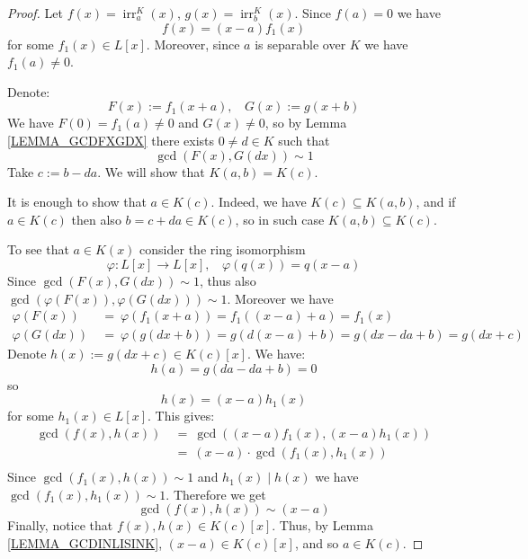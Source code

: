 \documentclass[12pt, letterpaper, oneside]{article}
\theoremstyle{plain}
\theoremstyle{definition}
\newcommand{\irr}{\operatorname{irr}}
\newcommand{\vs}{\vskip 5mm}
\begin{document}
\vs \vs

\begin{proof}
Let $f(x) = \irr^{K}_{a}(x)$, $g(x)= \irr^{K}_{b}(x)$. Since $f(a)= 0$ we have 
$$f(x)= (x-a)f_{1}(x)$$
for some $f_{1}(x)\in L[x]$. Moreover, since $a$ is separable over $K$ we have 
$f_{1}(a) \neq 0$. 

Denote:
$$F(x):= f_{1}(x+a), \ \ \ \ G(x):= g(x+b)$$
We have $F(0) = f_{1}(a) \neq 0$ and $G(x)\neq 0$, so by Lemma \ref{LEMMA_GCDFXGDX}
there exists $0\neq d\in K$ such that 
$$\gcd(F(x), G(dx))\sim 1$$
Take $c:= b-da$. We will show that $K(a, b) = K(c)$. 

It is enough to show that $a\in K(c)$. Indeed, we have $K(c)\subseteq K(a, b)$, and if
$a\in K(c)$ then also $b= c + da \in K(c)$, so in such case $K(a, b)\subseteq K(c)$. 


To see that $a\in K(x)$ consider the ring isomorphism 
$$\varphi\colon L[x] \to L[x], \ \ \ \ \varphi(q(x)) = q(x-a)$$
Since $\gcd(F(x), G(dx))\sim 1$, thus also $\gcd(\varphi(F(x)), \varphi(G(dx)))\sim 1$.
Moreover we have 
\begin{align*}
\varphi(F(x)) & \ = \   \varphi(f_{1}(x+a)) = f_{1}((x-a)+a) = f_{1}(x)  \ \\
\varphi(G(dx)) & \ =\   \varphi(g(dx +b)) = g(d(x-a) +b) = g(dx -da+b) = g(dx +c)  \ 
\end{align*}
Denote $h(x):= g(dx+c) \in K(c)[x]$.  We have:
$$h(a) = g(da-da + b) = 0$$
so 
$$h(x) = (x-a)h_{1}(x)$$
for some $h_{1}(x)\in L[x]$.  This gives: 
\begin{align*}
\gcd(f(x), h(x)) &\   =\  \gcd((x-a)f_{1}(x), (x-a)h_{1}(x))  \\
& \  = \ (x-a)\cdot \gcd(f_{1}(x), h_{1}(x)) \\
\end{align*}
Since $\gcd(f_{1}(x), h(x))\sim 1$ and $h_{1}(x)\mid h(x)$ we have
$\gcd(f_{1}(x), h_{1}(x))\sim 1$. Therefore we get 
$$\gcd(f(x), h(x))\sim (x-a)$$
Finally, notice that $f(x), h(x)\in K(c)[x]$. Thus, by Lemma \ref{LEMMA_GCDINLISINK}, 
$(x-a)\in K(c)[x]$, and so $a\in K(c)$. 

\end{proof}


\vs\vs
\end{document}
